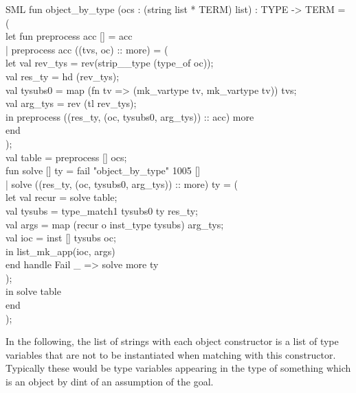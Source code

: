 \documentclass[11pt,a4paper]{article}
\begin{document}
\begin{GFT}{SML}
\+fun \PrNL{}object\_by\_type\PrNN{} (ocs : (string list * TERM) list) : TYPE -> TERM = (\\
\+	let	fun preprocess acc [] = acc\\
\+		|   preprocess acc ((tvs, oc) :: more) = (\\
\+			let	val rev\_tys = rev(strip\_\PrKN{}\_type (type\_of oc));\\
\+				val res\_ty = hd (rev\_tys);\\
\+				val tysubs0 = map (fn tv => (mk\_vartype tv, mk\_vartype tv)) tvs;\\
\+				val arg\_tys = rev (tl rev\_tys);\\
\+			in	preprocess ((res\_ty,  (oc, tysubs0, arg\_tys)) :: acc) more\\
\+			end\\
\+		);\\
\+		val table = preprocess [] ocs;\\
\+		fun solve [] ty = fail "object\_by\_type" 1005 []\\
\+		|   solve ((res\_ty, (oc, tysubs0, arg\_tys)) :: more) ty = (\\
\+			let	val recur = solve table;\\
\+				val tysubs = type\_match1 tysubs0 ty res\_ty;\\
\+				val args = map (recur o inst\_type tysubs) arg\_tys;\\
\+				val ioc = inst [] tysubs oc;\\
\+			in	list\_mk\_app(ioc, args)\\
\+			end	handle Fail \_ => solve more ty\\
\+		);\\
\+	in	solve table\\
\+	end\\
\+);\\
\end{GFT}

In the following, the list of strings with each object constructor is a list of type variables that are not to be instantiated when matching with this constructor. Typically these would be type variables appearing in the type of something which is an object by dint of an assumption of the goal.
\end{document}
